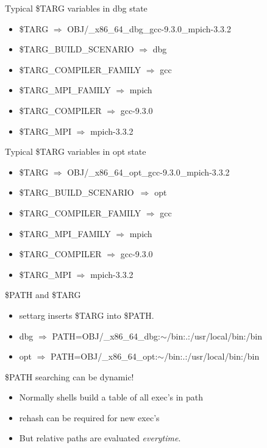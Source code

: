 \documentclass{beamer}
\begin{document}
\begin{frame}{Typical \$TARG variables in dbg state}
  \begin{itemize}
    \item \$TARG $\Rightarrow$ OBJ/\_x86\_64\_dbg\_gcc-9.3.0\_mpich-3.3.2
    \item \$TARG\_BUILD\_SCENARIO $\Rightarrow$  dbg
    \item \$TARG\_COMPILER\_FAMILY $\Rightarrow$  gcc
    \item \$TARG\_MPI\_FAMILY $\Rightarrow$  mpich
    \item \$TARG\_COMPILER $\Rightarrow$  gcc-9.3.0
    \item \$TARG\_MPI $\Rightarrow$    mpich-3.3.2
  \end{itemize}
\end{frame}

\begin{frame}{Typical \$TARG variables in opt state}
  \begin{itemize}
    \item \$TARG $\Rightarrow$  OBJ/\_x86\_64\_opt\_gcc-9.3.0\_mpich-3.3.2
    \item \$TARG\_BUILD\_SCENARIO\ $\Rightarrow$  opt
    \item \$TARG\_COMPILER\_FAMILY $\Rightarrow$  gcc
    \item \$TARG\_MPI\_FAMILY $\Rightarrow$ mpich
    \item \$TARG\_COMPILER $\Rightarrow$ gcc-9.3.0
    \item \$TARG\_MPI  $\Rightarrow$   mpich-3.3.2
  \end{itemize}
\end{frame}

\begin{frame}{\$PATH and \$TARG}
  \begin{itemize}
    \item settarg inserts \$TARG into \$PATH.
    \item dbg $\Rightarrow$ PATH=OBJ/\_x86\_64\_dbg:$\sim$/bin:.:/usr/local/bin:/bin
    \item opt $\Rightarrow$ PATH=OBJ/\_x86\_64\_opt:$\sim$/bin:.:/usr/local/bin:/bin
  \end{itemize}
\end{frame}

\begin{frame}{\$PATH searching can be dynamic!}
  \begin{itemize}
    \item Normally shells build a table of all exec's in path
    \item rehash can be required for new exec's
    \item But relative paths are evaluated \emph{everytime}.
  \end{itemize}
\end{frame}
\end{document}
